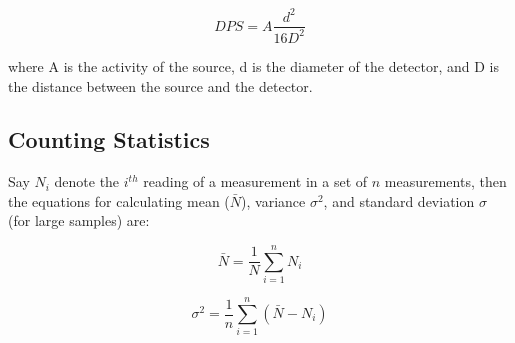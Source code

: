 		\begin{equation}
			DPS = A\frac{d^2}{16D^2}
			\label{eq:2}
		\end{equation}

		where A is the activity of the source, d is the diameter of the detector, and D is the distance between the source and the detector.

	\subsection{Counting Statistics}

		Say $N_i$ denote the $i^{th}$ reading of a measurement in a set of $n$ measurements, then the equations for calculating mean ($\bar{N}$), variance $\sigma^2$, and standard deviation $\sigma$ (for large samples) are:

		$$\bar{N} = \frac{1}{N}\sum_{i = 1}^{n} N_i$$

		$$\sigma^2 = \frac{1}{n} \sum_{i = 1}^{n} (\bar{N} - N_i)$$

